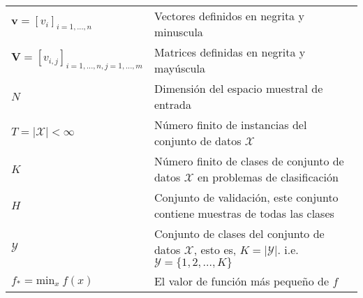 \begin{table}[ht!]
\begin{center}
\begin{tabularx}{\textwidth}{|l|X|}
            $\textbf{v} = [v_{i}]_{i=1,...,n}$                                                                                   & Vectores definidos en negrita y minuscula                                                                                                                                   \\
            $\textbf{V} = [v_{i,j}]_{i=1,...,n, j=1,...,m}$                                                                      & Matrices definidas en negrita y mayúscula                                                                                                                                   \\
            $N$                                                                                                                  & Dimensión del espacio muestral de entrada                                                                                                                                   \\
            $T = \lvert \mathcal{X} \rvert < \infty$                                                                             & Número finito de instancias del conjunto de datos $\mathcal{X}$                                                                                                             \\
            $K$                                                                                                                  & Número finito de clases de conjunto de datos $\mathcal{X}$ en problemas de clasificación                                                                                    \\
            $H$                                                                                                                  & Conjunto de validación, este conjunto contiene muestras de todas las clases                                                                                                 \\
            $\mathcal{Y}$                                                                                                        & Conjunto de clases del conjunto de datos $\mathcal{X}$, esto es, $\textit{K} = \lvert \mathcal{Y} \rvert$. i.e. ${\scriptscriptstyle \mathcal{Y} = \{1,2,...,\textit{K}\}}$ \\
            $f_{*} = \text{min}_x~f(x)$                                                                                          & El valor de función más pequeño de $f$                                                                                                                                      \\

\end{tabularx}
\end{center}
\end{table}

